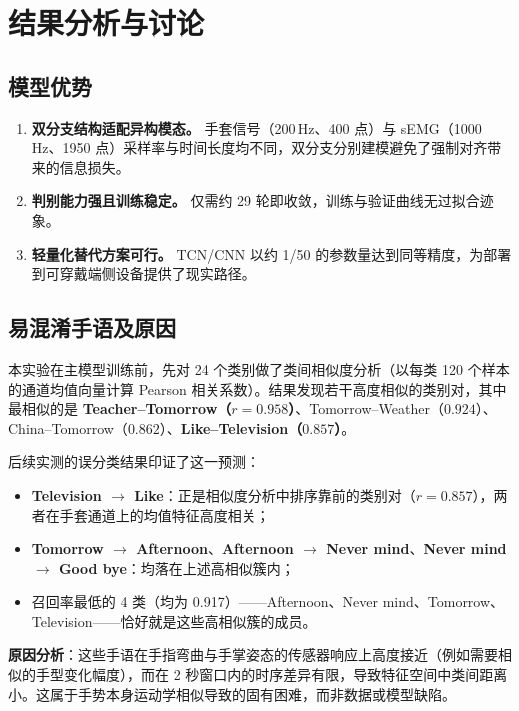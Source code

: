 \documentclass[11pt,a4paper]{ctexart}
\begin{document}
\section{结果分析与讨论}
\label{sec:analysis}

\subsection{模型优势}

\begin{enumerate}[leftmargin=2em]
\item \textbf{双分支结构适配异构模态。} 手套信号（200\,Hz、400 点）与 sEMG（1000\,Hz、1950 点）采样率与时间长度均不同，双分支分别建模避免了强制对齐带来的信息损失。
\item \textbf{判别能力强且训练稳定。} 仅需约 29 轮即收敛，训练与验证曲线无过拟合迹象。
\item \textbf{轻量化替代方案可行。} TCN/CNN 以约 1/50 的参数量达到同等精度，为部署到可穿戴端侧设备提供了现实路径。
\end{enumerate}

\subsection{易混淆手语及原因}

本实验在主模型训练前，先对 24 个类别做了类间相似度分析（以每类 120 个样本的通道均值向量计算 Pearson 相关系数）。结果发现若干高度相似的类别对，其中最相似的是 \textbf{Teacher--Tomorrow（$r=0.958$）}、Tomorrow--Weather（$0.924$）、China--Tomorrow（$0.862$）、\textbf{Like--Television（$0.857$）}。

后续实测的误分类结果印证了这一预测：

\begin{itemize}[leftmargin=2em]
\item \textbf{Television $\rightarrow$ Like}：正是相似度分析中排序靠前的类别对（$r=0.857$），两者在手套通道上的均值特征高度相关；
\item \textbf{Tomorrow $\rightarrow$ Afternoon}、\textbf{Afternoon $\rightarrow$ Never mind}、\textbf{Never mind $\rightarrow$ Good bye}：均落在上述高相似簇内；
\item 召回率最低的 4 类（均为 0.917）——Afternoon、Never mind、Tomorrow、Television——恰好就是这些高相似簇的成员。
\end{itemize}

\textbf{原因分析}：这些手语在手指弯曲与手掌姿态的传感器响应上高度接近（例如需要相似的手型变化幅度），而在 2 秒窗口内的时序差异有限，导致特征空间中类间距离小。这属于手势本身运动学相似导致的固有困难，而非数据或模型缺陷。
\end{document}
